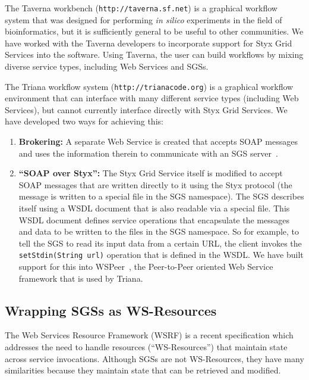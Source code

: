 \documentclass{llncs}
\begin{document}
The Taverna workbench ({\tt http://taverna.sf.net}) is a graphical workflow system that was designed for performing {\it in silico} experiments in the field of bioinformatics, but it is sufficiently general to be useful to other communities.  We have worked with the Taverna developers to incorporate support for Styx Grid Services into the software.  Using Taverna, the user can build workflows by mixing diverse service types, including Web Services and SGSs.

The Triana workflow system ({\tt http://trianacode.org}) is a graphical workflow environment that can interface with many different service types (including Web Services), but cannot currently interface directly with Styx Grid Services.  We have developed two ways for achieving this:

\begin{enumerate}
	\item {\bf Brokering:} A separate Web Service is created that accepts SOAP messages and uses the information therein to communicate with an SGS server~\cite{blower:2005}.
	\item {\bf ``SOAP over Styx'':} The Styx Grid Service itself is modified to accept SOAP messages that are written directly to it using the Styx protocol (the message is written to a special file in the SGS namespace).  The SGS describes itself using a WSDL document that is also readable via a special file.  This WSDL document defines service operations that encapsulate the messages and data to be written to the files in the SGS namespace.  So for example, to tell the SGS to read its input data from a certain URL, the client invokes the {\tt setStdin(String url)} operation that is defined in the WSDL.  We have built support for this into WSPeer~\cite{wspeer}, the Peer-to-Peer oriented Web Service framework that is used by Triana.
\end{enumerate}

\subsection{Wrapping SGSs as WS-Resources}\label{subsec:ws-resources}

The Web Services Resource Framework (WSRF) is a recent specification which addresses the need to handle resources (``WS-Resources'') that maintain state across service invocations.  Although SGSs are not WS-Resources, they have many similarities because they maintain state that can be retrieved and modified.
\end{document}
